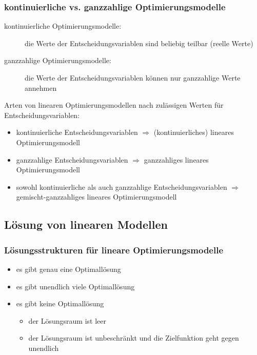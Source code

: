 \begin{frame}
 \frametitle{kontinuierliche vs. ganzzahlige Optimierungsmodelle}
 \begin{description}
  \item[kontinuierliche Optimierungsmodelle:] die Werte der Entscheidungsvariablen sind beliebig teilbar (reelle Werte)
  \item[ganzzahlige Optimierungsmodelle:] die Werte der Entscheidungsvariablen können nur ganzzahlige Werte annehmen
 \end{description}
 
 \begin{block}{Arten von linearen Optimierungsmodellen nach zulässigen Werten für Entscheidungsvariablen:}
  \begin{itemize}\footnotesize
   \item kontinuierliche Entscheidungsvariablen $\Longrightarrow$ (kontinuierliches) lineares Optimierungsmodell
   \item ganzzahlige Entscheidungsvariablen $\Longrightarrow$ ganzzahliges lineares Optimierungsmodell
   \item sowohl kontinuierliche als auch ganzzahlige Entscheidungsvariablen $\Longrightarrow$ gemischt-ganzzahliges lineares Optimierungsmodell
  \end{itemize}
 \end{block}
\end{frame}

\subsection{Lösung von linearen Modellen}

\begin{frame}
 \frametitle{Lösungsstrukturen für lineare Optimierungsmodelle}
 \begin{itemize}
  \item es gibt genau eine Optimallösung
  \item es gibt unendlich viele Optimallösung %
  \item es gibt keine Optimallösung
  \begin{itemize}
   \item der Lösungsraum ist leer
   \item der Lösungsraum ist unbeschränkt und die Zielfunktion geht gegen unendlich
  \end{itemize}
 \end{itemize}
\end{frame}


